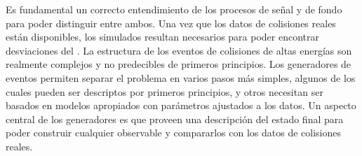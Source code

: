 Es fundamental un correcto entendimiento de los procesos de señal y de fondo para poder distinguir entre ambos. Una vez que los datos de colisiones reales están disponibles, los simulados resultan necesarios para poder encontrar desviaciones del \ME.
La estructura de los eventos de colisiones de altas energías son realmente complejos y no predecibles de primeros principios. Los generadores de eventos permiten separar el problema en varios pasos más simples, algunos de los cuales pueden ser descriptos por primeros principios, y otros necesitan ser basados en modelos apropiados con parámetros ajustados a los datos. Un aspecto central de los generadores es que proveen una descripción del estado final para poder construir cualquier observable y compararlos con los datos de colisiones reales.




